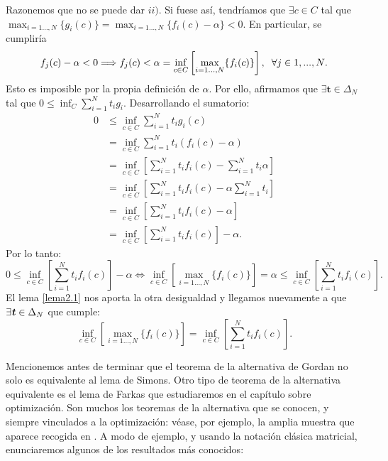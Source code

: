 Razonemos que no se puede dar $ ii) $. Si fuese así, tendríamos que $ \exists c \in C $ tal que $ \max_{i=1\dots,N } \{g_i(c)\} =  \max_{i=1\dots,N } \{f_i(c) - \alpha \} < 0 $. En particular, se cumpliría \[ f_j(c) - \alpha < 0 \Longrightarrow f_j(c) < \alpha = \inf_{ c\in C}\left[\max_{i=1\dots,N } \{f_i(c)\} \right],\hspace{2mm} \forall  j \in {1,...,N}. \] Esto es imposible por la propia definición de $ \alpha $. Por ello, afirmamos que $ \exists \mathbf{t} \in \Delta_N $ tal que $ 0 \leq \inf_{C}  \sum_{i=1}^{N}{t_i g_i}$. Desarrollando el sumatorio:
\begin{equation*}
\begin{split}
0 &\leq \inf_{c \in C}  \sum_{i=1}^{N}{t_i g_i (c)}\\
 &= \inf_{c \in C}  \sum_{i=1}^{N}{t_i(f_i(c) - \alpha)} \\
&= \inf_{c \in C} \left[ \sum_{i=1}^{N}{t_i f_i(c)} - \sum_{i=1}^{N}{t_i\alpha} \right]\\
&= \inf_{c \in C} \left[ \sum_{i=1}^{N}{t_i f_i(c)} -\alpha \sum_{i=1}^{N}{t_i} \right] \\ 
&= \inf_{c \in C} \left[ \sum_{i=1}^{N}{t_i f_i(c)} - \alpha \right] \\
&= \inf_{c \in C} \left[ \sum_{i=1}^{N}{t_i f_i(c)}\right] - \alpha.
\end{split}
\end{equation*}
Por lo tanto:
\[
0 \leq \inf_{c \in C} \left[ \sum_{i=1}^{N}{t_i f_i(c)}\right] - \alpha \Longleftrightarrow \inf_{c \in C}\left[ \max_{i=1\dots,N } \{f_i(c)\}\right] = \alpha  \leq \inf_{c \in C} \left[ \sum_{i=1}^{N}{t_i f_i(c)}\right].
\]
El lema \ref{lema2.1} nos aporta la otra desigualdad y llegamos nuevamente a que $ \exists \textbf{\emph{t}} \in \Delta_N $ que cumple:
\[
\inf_{c \in C}\left[ \max_{i=1\dots,N } \{f_i(c)\}\right] = \inf_{c \in C} \left[ \sum_{i=1}^{N}{t_i f_i(c)}\right]. \]
\hspace{12.2cm}\qedsymbol 

\bigskip

Mencionemos antes de terminar que el teorema de la alternativa de Gordan no solo es equivalente al lema de Simons. Otro tipo de teorema de la alternativa equivalente es el lema de Farkas que estudiaremos en el capítulo sobre optimización. Son muchos los teoremas de la alternativa que se conocen, y siempre vinculados a la optimización: véase, por ejemplo, la amplia muestra que aparece recogida en \cite{giorgi2004mathematics}. A modo de ejemplo, y usando la notación clásica matricial, enunciaremos algunos de los resultados más conocidos:

